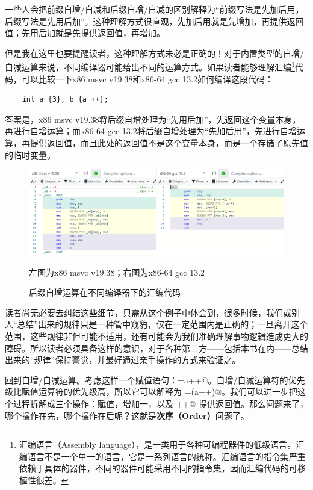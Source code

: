 一些人会把前缀自增/自减和后缀自增/自减的区别解释为``前缀写法是先加后用，后缀写法是先用后加''。这种理解方式很直观，先加后用就是先增加，再提供返回值；先用后加就是先提供返回值，再增加。\par
但是我在这里也要提醒读者，这种理解方式未必是正确的！对于内置类型的自增/自减运算来说，不同编译器可能给出不同的运算方式。如果读者能够理解汇编\footnote{汇编语言（Assembly language），是一类用于各种可编程器件的低级语言。汇编语言不是一个单一的语言，它是一系列语言的统称。汇编语言的指令集严重依赖于具体的器件，不同的器件可能采用不同的指令集，因而汇编代码的可移植性很差。}代码，可以比较一下x86 msvc v19.38和x86-64 gcc 13.2如何编译这段代码：
\begin{lstlisting}
    int a {3}, b {a ++};
\end{lstlisting}
答案是，x86 msvc v19.38将后缀自增处理为``先用后加''，先返回这个变量本身，再进行自增运算；而x86-64 gcc 13.2将后缀自增处理为``先加后用''，先进行自增运算，再提供返回值，而且此处的返回值不是这个变量本身，而是一个存储了原先值的临时变量。\par
\begin{figure}[htbp]
    \centering
    \includegraphics[width=\textwidth]{../images/generalized_parts/03_how_compilers_interpret_postfix_increment.png}
    \caption{后缀自增运算在不同编译器下的汇编代码}
    \footnotesize{左图为x86 msvc v19.38；右图为x86-64 gcc 13.2}
\end{figure}
读者尚无必要去纠结这些细节，只需从这个例子中体会到，很多时候，我们或别人``总结''出来的规律只是一种管中窥豹，仅在一定范围内是正确的；一旦离开这个范围，这些规律非但可能不适用，还有可能会为我们准确理解事物逻辑造成更大的障碍。所以读者必须具备这样的意识，对于各种第三方——包括本书在内——总结出来的``规律''保持警觉，并最好通过亲手操作的方式来验证之。\par
回到自增/自减运算。考虑这样一个赋值语句：\lstinline@b=a++@。自增/自减运算符的优先级比赋值运算符的优先级高，所以它可以解释为 \lstinline@b=(a++)@。我们可以进一步把这个过程拆解成三个操作：赋值，\lstinline@a@ 增加一，以及 \lstinline@a++@ 提供返回值。那么问题来了，哪个操作在先，哪个操作在后呢？这就是\textbf{次序（Order）}问题了。\par

